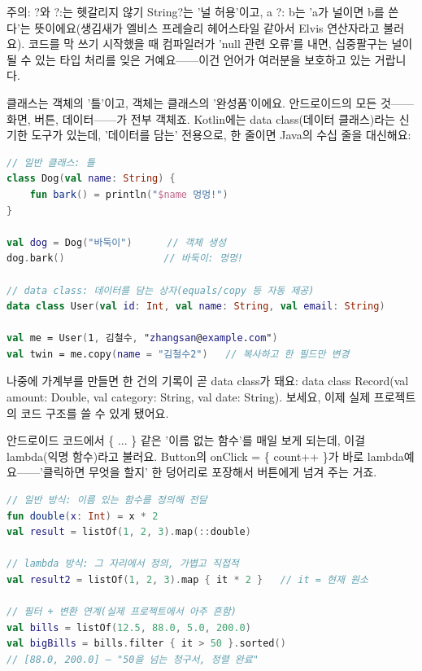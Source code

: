 \begin{tcbwarn}{주의: ?와 ?:는 헷갈리지 않기}
String?는 '널 허용'이고, a ?: b는 'a가 널이면 b를 쓴다'는 뜻이에요(생김새가 엘비스 프레슬리 헤어스타일 같아서 Elvis 연산자라고 불러요). 코드를 막 쓰기 시작했을 때 컴파일러가 'null 관련 오류'를 내면, 십중팔구는 널이 될 수 있는 타입 처리를 잊은 거예요——이건 언어가 여러분을 보호하고 있는 거랍니다.

\end{tcbwarn}


클래스는 객체의 '틀'이고, 객체는 클래스의 '완성품'이에요. 안드로이드의 모든 것——화면, 버튼, 데이터——가 전부 객체죠. Kotlin에는 data class(데이터 클래스)라는 신기한 도구가 있는데, '데이터를 담는' 전용으로, 한 줄이면 Java의 수십 줄을 대신해요:

\begin{lstlisting}[language=Kotlin]
// 일반 클래스: 틀
class Dog(val name: String) {
    fun bark() = println("$name 멍멍!")
}

val dog = Dog("바둑이")      // 객체 생성
dog.bark()                 // 바둑이: 멍멍!

// data class: 데이터를 담는 상자(equals/copy 등 자동 제공)
data class User(val id: Int, val name: String, val email: String)

val me = User(1, 김철수, "zhangsan@example.com")
val twin = me.copy(name = "김철수2")   // 복사하고 한 필드만 변경
\end{lstlisting}

나중에 가계부를 만들면 한 건의 기록이 곧 data class가 돼요: data class Record(val amount: Double, val category: String, val date: String). 보세요, 이제 실제 프로젝트의 코드 구조를 쓸 수 있게 됐어요.


안드로이드 코드에서 \{ ... \} 같은 '이름 없는 함수'를 매일 보게 되는데, 이걸 lambda(익명 함수)라고 불러요. Button의 onClick = \{ count++ \}가 바로 lambda예요——'클릭하면 무엇을 할지' 한 덩어리로 포장해서 버튼에게 넘겨 주는 거죠.

\begin{lstlisting}[language=Kotlin]
// 일반 방식: 이름 있는 함수를 정의해 전달
fun double(x: Int) = x * 2
val result = listOf(1, 2, 3).map(::double)

// lambda 방식: 그 자리에서 정의, 가볍고 직접적
val result2 = listOf(1, 2, 3).map { it * 2 }   // it = 현재 원소

// 필터 + 변환 연계(실제 프로젝트에서 아주 흔함)
val bills = listOf(12.5, 88.0, 5.0, 200.0)
val bigBills = bills.filter { it > 50 }.sorted()
// [88.0, 200.0] — "50을 넘는 청구서, 정렬 완료"
\end{lstlisting}

